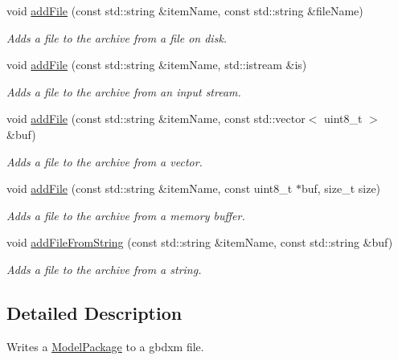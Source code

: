 \begin{DoxyCompactItemize}
void \hyperlink{group___classification_module_gae289cee9ebc10a5cb834404c73e3dd7e}{add\+File} (const std\+::string \&item\+Name, const std\+::string \&file\+Name)
\begin{DoxyCompactList}\small\item\em Adds a file to the archive from a file on disk. \end{DoxyCompactList}\item 
void \hyperlink{group___classification_module_ga0f6ad9a470685adc23659eb7a3aa46eb}{add\+File} (const std\+::string \&item\+Name, std\+::istream \&is)
\begin{DoxyCompactList}\small\item\em Adds a file to the archive from an input stream. \end{DoxyCompactList}\item 
void \hyperlink{group___classification_module_gac4840a6a32e802a42f75732b2ec75de8}{add\+File} (const std\+::string \&item\+Name, const std\+::vector$<$ uint8\+\_\+t $>$ \&buf)
\begin{DoxyCompactList}\small\item\em Adds a file to the archive from a vector. \end{DoxyCompactList}\item 
void \hyperlink{group___classification_module_gafbcf569e170e01a25e9a1cc7a114a742}{add\+File} (const std\+::string \&item\+Name, const uint8\+\_\+t $\ast$buf, size\+\_\+t size)
\begin{DoxyCompactList}\small\item\em Adds a file to the archive from a memory buffer. \end{DoxyCompactList}\item 
void \hyperlink{group___classification_module_gaf0cf8086a94f63a55a3dedd710711c3d}{add\+File\+From\+String} (const std\+::string \&item\+Name, const std\+::string \&buf)
\begin{DoxyCompactList}\small\item\em Adds a file to the archive from a string. \end{DoxyCompactList}\end{DoxyCompactItemize}


\subsection{Detailed Description}
Writes a \hyperlink{classdg_1_1deepcore_1_1classification_1_1_model_package}{Model\+Package} to a gbdxm file. 